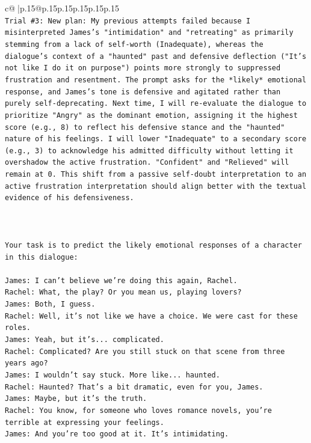 \documentclass{article}
\begin{document}
{\begin{supertabular}{c@{$\;$}|p{.15\linewidth}@{}p{.15\linewidth}p{.15\linewidth}p{.15\linewidth}p{.15\linewidth}p{.15\linewidth}}
{{{\\ 
\texttt{Trial \#3: New plan: My previous attempts failed because I misinterpreted James's "intimidation" and "retreating" as primarily stemming from a lack of self{-}worth (Inadequate), whereas the dialogue's context of a "haunted" past and defensive deflection ("It's not like I do it on purpose") points more strongly to suppressed frustration and resentment. The prompt asks for the *likely* emotional response, and James's tone is defensive and agitated rather than purely self{-}deprecating. Next time, I will re{-}evaluate the dialogue to prioritize "Angry" as the dominant emotion, assigning it the highest score (e.g., 8) to reflect his defensive stance and the "haunted" nature of his feelings. I will lower "Inadequate" to a secondary score (e.g., 3) to acknowledge his admitted difficulty without letting it overshadow the active frustration. "Confident" and "Relieved" will remain at 0. This shift from a passive self{-}doubt interpretation to an active frustration interpretation should align better with the textual evidence of his defensiveness.} \\
\\ 
\\ 
\\ 
\texttt{Your task is to predict the likely emotional responses of a character in this dialogue:} \\
\\ 
\texttt{James: I can't believe we're doing this again, Rachel. } \\
\texttt{Rachel: What, the play? Or you mean us, playing lovers?} \\
\texttt{James: Both, I guess. } \\
\texttt{Rachel: Well, it's not like we have a choice. We were cast for these roles. } \\
\texttt{James: Yeah, but it's... complicated.} \\
\texttt{Rachel: Complicated? Are you still stuck on that scene from three years ago?} \\
\texttt{James: I wouldn't say stuck. More like... haunted.} \\
\texttt{Rachel: Haunted? That's a bit dramatic, even for you, James.} \\
\texttt{James: Maybe, but it's the truth.} \\
\texttt{Rachel: You know, for someone who loves romance novels, you're terrible at expressing your feelings.} \\
\texttt{James: And you're too good at it. It's intimidating.} \\
}}}
\end{supertabular}}
\end{document}
